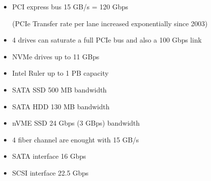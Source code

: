 \begin{itemize}
\item
  PCI express bus 15 GB/s = 120 Gbps 
  
  (PCIe Transfer rate per lane increased exponentially since 2003)
\item
  4 drives can saturate a full PCIe bus and also a 100 Gbps link
\item
  NVMe drives up to 11 GBps
\item
  Intel Ruler up to 1 PB capacity
\item
  SATA SSD 500 MB bandwidth
\item
  SATA HDD 130 MB bandwidth
\item
  nVME SSD 24 Gbps (3 GBps) bandwidth
\item
  4 fiber channel are enought with 15 GB/s
\item
  SATA interface 16 Gbps
\item
  SCSI interface 22.5 Gbps
\end{itemize}
